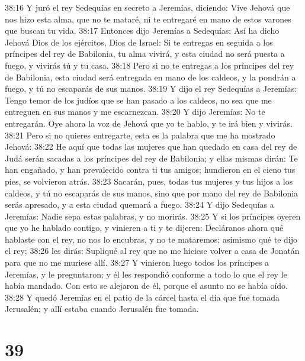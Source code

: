38:16 Y juró el rey Sedequías en secreto a Jeremías, diciendo: Vive Jehová que nos hizo esta alma, que no te mataré, ni te entregaré en mano de estos varones que buscan tu vida.  
38:17 Entonces dijo Jeremías a Sedequías: Así ha dicho Jehová Dios de los ejércitos, Dios de Israel: Si te entregas en seguida a los príncipes del rey de Babilonia, tu alma vivirá, y esta ciudad no será puesta a fuego, y vivirás tú y tu casa.  
38:18 Pero si no te entregas a los príncipes del rey de Babilonia, esta ciudad será entregada en mano de los caldeos, y la pondrán a fuego, y tú no escaparás de sus manos.  
38:19 Y dijo el rey Sedequías a Jeremías: Tengo temor de los judíos que se han pasado a los caldeos, no sea que me entreguen en sus manos y me escarnezcan.  
38:20 Y dijo Jeremías: No te entregarán. Oye ahora la voz de Jehová que yo te hablo, y te irá bien y vivirás.  
38:21 Pero si no quieres entregarte, esta es la palabra que me ha mostrado Jehová:  
38:22 He aquí que todas las mujeres que han quedado en casa del rey de Judá serán sacadas a los príncipes del rey de Babilonia; y ellas mismas dirán: Te han engañado, y han prevalecido contra ti tus amigos; hundieron en el cieno tus pies, se volvieron atrás.  
38:23 Sacarán, pues, todas tus mujeres y tus hijos a los caldeos, y tú no escaparás de sus manos, sino que por mano del rey de Babilonia serás apresado, y a esta ciudad quemará a fuego.  
38:24 Y dijo Sedequías a Jeremías: Nadie sepa estas palabras, y no morirás.  
38:25 Y si los príncipes oyeren que yo he hablado contigo, y vinieren a ti y te dijeren: Decláranos ahora qué hablaste con el rey, no nos lo encubras, y no te mataremos; asimismo qué te dijo el rey;  
38:26 les dirás: Supliqué al rey que no me hiciese volver a casa de Jonatán para que no me muriese allí.  
38:27 Y vinieron luego todos los príncipes a Jeremías, y le preguntaron; y él les respondió conforme a todo lo que el rey le había mandado. Con esto se alejaron de él, porque el asunto no se había oído.  
38:28 Y quedó Jeremías en el patio de la cárcel hasta el día que fue tomada Jerusalén; y allí estaba cuando Jerusalén fue tomada. 

\chapter{39}

